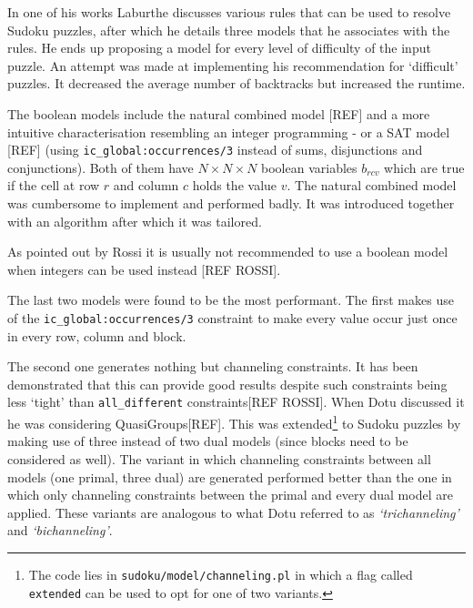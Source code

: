 In one of his works Laburthe discusses various rules that can be used to resolve Sudoku puzzles, after which he details three models that he associates with the rules. He ends up proposing a model for every level of difficulty of the input puzzle. An attempt was made at implementing his recommendation for `difficult' puzzles. It decreased the average number of backtracks but increased the runtime. \\\par

The boolean models include the natural combined model [REF] and a more intuitive characterisation resembling an integer programming - or a SAT model [REF] (using \texttt{ic\_global:occurrences/3} instead of sums, disjunctions and conjunctions). Both of them have $N\times N\times N$ boolean variables $b_{rcv}$ which are true if the cell at row $r$ and column $c$ holds the value $v$. The natural combined model was cumbersome to implement and performed badly. It was introduced together with an algorithm after which it was tailored.\par
As pointed out by Rossi it is usually not recommended to use a boolean model when integers can be used instead [REF ROSSI].\\\par

The last two models were found to be the most performant. The first makes use of the \texttt{ic\_global:occurrences/3} constraint to make every value occur just once in every row, column and block. 
\par The second one generates nothing but channeling constraints. It has been demonstrated that this can provide good results despite such constraints being less `tight' than \texttt{all\_different} constraints[REF ROSSI]. When Dotu discussed it he was considering QuasiGroups[REF]. This was extended\footnote{The code lies in \texttt{sudoku/model/channeling.pl} in which a flag called \texttt{extended} can be used to opt for one of two variants.} to Sudoku puzzles by making use of three instead of two dual models (since blocks need to be considered as well). The variant in which channeling constraints between all models (one primal, three dual) are generated performed better than the one in which only channeling constraints between the primal and every dual model are applied. These variants are analogous to what Dotu referred to as \textit{`trichanneling'} and \textit{`bichanneling'}. \\\par

